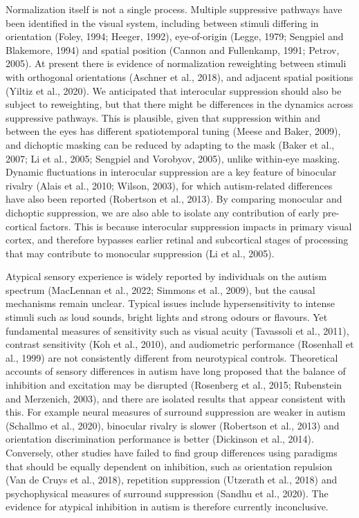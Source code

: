 \documentclass[
]{article}
\begin{document}
Normalization itself is not a single process. Multiple suppressive pathways have been identified in the visual system, including between stimuli differing in orientation (Foley, 1994; Heeger, 1992), eye-of-origin (Legge, 1979; Sengpiel and Blakemore, 1994) and spatial position (Cannon and Fullenkamp, 1991; Petrov, 2005). At present there is evidence of normalization reweighting between stimuli with orthogonal orientations (Aschner et al., 2018), and adjacent spatial positions (Yiltiz et al., 2020). We anticipated that interocular suppression should also be subject to reweighting, but that there might be differences in the dynamics across suppressive pathways. This is plausible, given that suppression within and between the eyes has different spatiotemporal tuning (Meese and Baker, 2009), and dichoptic masking can be reduced by adapting to the mask (Baker et al., 2007; Li et al., 2005; Sengpiel and Vorobyov, 2005), unlike within-eye masking. Dynamic fluctuations in interocular suppression are a key feature of binocular rivalry (Alais et al., 2010; Wilson, 2003), for which autism-related differences have also been reported (Robertson et al., 2013). By comparing monocular and dichoptic suppression, we are also able to isolate any contribution of early pre-cortical factors. This is because interocular suppression impacts in primary visual cortex, and therefore bypasses earlier retinal and subcortical stages of processing that may contribute to monocular suppression (Li et al., 2005).

Atypical sensory experience is widely reported by individuals on the autism spectrum (MacLennan et al., 2022; Simmons et al., 2009), but the causal mechanisms remain unclear. Typical issues include hypersensitivity to intense stimuli such as loud sounds, bright lights and strong odours or flavours. Yet fundamental measures of sensitivity such as visual acuity (Tavassoli et al., 2011), contrast sensitivity (Koh et al., 2010), and audiometric performance (Rosenhall et al., 1999) are not consistently different from neurotypical controls. Theoretical accounts of sensory differences in autism have long proposed that the balance of inhibition and excitation may be disrupted (Rosenberg et al., 2015; Rubenstein and Merzenich, 2003), and there are isolated results that appear consistent with this. For example neural measures of surround suppression are weaker in autism (Schallmo et al., 2020), binocular rivalry is slower (Robertson et al., 2013) and orientation discrimination performance is better (Dickinson et al., 2014). Conversely, other studies have failed to find group differences using paradigms that should be equally dependent on inhibition, such as orientation repulsion (Van de Cruys et al., 2018), repetition suppression (Utzerath et al., 2018) and psychophysical measures of surround suppression (Sandhu et al., 2020). The evidence for atypical inhibition in autism is therefore currently inconclusive.
\end{document}
